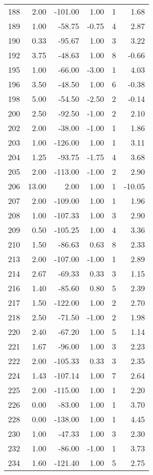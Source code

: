 \begin{appendices}
\begin{longtable}[c]{@{}rrrrrr@{}}
188 & 2.00 & -101.00 & 1.00 & 1 & 1.68 \\
189 & 1.00 & -58.75 & -0.75 & 4 & 2.87 \\
190 & 0.33 & -95.67 & 1.00 & 3 & 3.22 \\
192 & 3.75 & -48.63 & 1.00 & 8 & -0.66 \\
195 & 1.00 & -66.00 & -3.00 & 1 & 4.03 \\
196 & 3.50 & -48.50 & 1.00 & 6 & -0.38 \\
198 & 5.00 & -54.50 & -2.50 & 2 & -0.14 \\
200 & 2.50 & -92.50 & -1.00 & 2 & 2.10 \\
202 & 2.00 & -38.00 & -1.00 & 1 & 1.86 \\
203 & 1.00 & -126.00 & 1.00 & 1 & 3.11 \\
204 & 1.25 & -93.75 & -1.75 & 4 & 3.68 \\
205 & 2.00 & -113.00 & -1.00 & 2 & 2.90 \\
206 & 13.00 & 2.00 & 1.00 & 1 & -10.05 \\
207 & 2.00 & -109.00 & 1.00 & 1 & 1.96 \\
208 & 1.00 & -107.33 & 1.00 & 3 & 2.90 \\
209 & 0.50 & -105.25 & 1.00 & 4 & 3.36 \\
210 & 1.50 & -86.63 & 0.63 & 8 & 2.33 \\
213 & 2.00 & -107.00 & -1.00 & 1 & 2.89 \\
214 & 2.67 & -69.33 & 0.33 & 3 & 1.15 \\
216 & 1.40 & -85.60 & 0.80 & 5 & 2.39 \\
217 & 1.50 & -122.00 & 1.00 & 2 & 2.70 \\
218 & 2.50 & -71.50 & -1.00 & 2 & 1.98 \\
220 & 2.40 & -67.20 & 1.00 & 5 & 1.14 \\
221 & 1.67 & -96.00 & 1.00 & 3 & 2.23 \\
222 & 2.00 & -105.33 & 0.33 & 3 & 2.35 \\
224 & 1.43 & -107.14 & 1.00 & 7 & 2.64 \\
225 & 2.00 & -115.00 & 1.00 & 1 & 2.20 \\
226 & 0.00 & -83.00 & 1.00 & 1 & 3.70 \\
228 & 0.00 & -138.00 & 1.00 & 1 & 4.45 \\
230 & 1.00 & -47.33 & 1.00 & 3 & 2.30 \\
232 & 1.00 & -86.00 & -1.00 & 1 & 3.73 \\
234 & 1.60 & -121.40 & 1.00 & 5 & 2.75 \\

\end{longtable}
\end{appendices}
